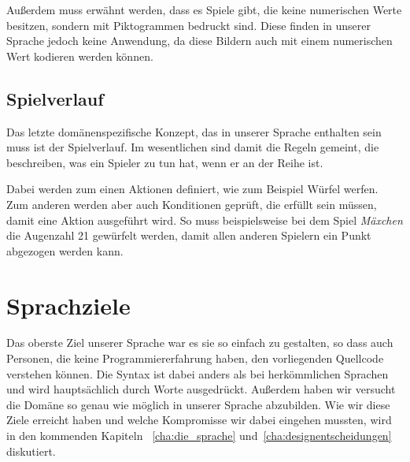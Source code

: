                 Außerdem muss erwähnt werden, dass es Spiele gibt, die keine numerischen Werte besitzen, sondern mit Piktogrammen bedruckt sind. Diese finden in unserer Sprache jedoch keine Anwendung, da diese Bildern auch mit einem numerischen Wert kodieren werden können.
			\subsection{Spielverlauf}
			\label{sub:spielverlauf}
				Das letzte domänenspezifische Konzept, das in unserer Sprache enthalten sein muss ist der Spielverlauf. Im wesentlichen sind damit die Regeln gemeint, die beschreiben, was ein Spieler zu tun hat, wenn er an der Reihe ist.
				
				Dabei werden zum einen Aktionen definiert, wie zum Beispiel Würfel werfen. Zum anderen werden aber auch Konditionen geprüft, die erfüllt sein müssen, damit eine Aktion ausgeführt wird. So muss beispielsweise bei dem Spiel \emph{Mäxchen} die Augenzahl 21 gewürfelt werden, damit allen anderen Spielern ein Punkt abgezogen werden kann.
			
		\section{Sprachziele}
		\label{sec:sprachziele}
            Das oberste Ziel unserer Sprache war es sie so einfach zu gestalten, so dass auch Personen, die keine Programmiererfahrung haben, den vorliegenden Quellcode verstehen können. Die Syntax ist dabei anders als bei herkömmlichen Sprachen und wird hauptsächlich durch Worte ausgedrückt.
            Außerdem haben wir versucht die Domäne so genau wie möglich in unserer Sprache abzubilden. Wie wir diese Ziele erreicht haben und welche Kompromisse wir dabei eingehen mussten, wird in den kommenden Kapiteln ~\ref{cha:die_sprache} und~\ref{cha:designentscheidungen} diskutiert.
